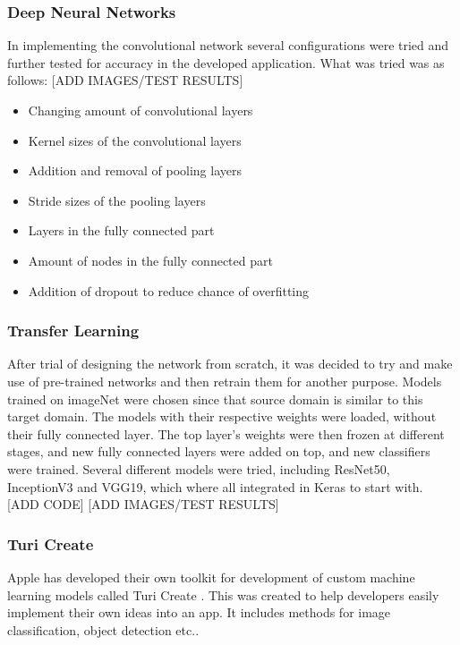 \subsubsection{Deep Neural Networks}
In implementing the convolutional network several configurations were tried and further tested for accuracy in the developed application. What was tried was as follows:
[ADD IMAGES/TEST RESULTS]

\begin{itemize}
\item Changing amount of convolutional layers
\item Kernel sizes of the convolutional layers
\item Addition and removal of pooling layers
\item Stride sizes of the pooling layers
\item Layers in the fully connected part
\item Amount of nodes in the fully connected part
\item Addition of dropout to reduce chance of overfitting 
\end{itemize}

\subsubsection{Transfer Learning}
After trial of designing the network from scratch, it was decided to try and make use of pre-trained networks and then retrain them for another purpose. Models trained on imageNet \cite{imageNet} were chosen since that source domain is similar to this target domain. The models with their respective weights were loaded, without their fully connected layer. The top layer's weights were then frozen at different stages, and new fully connected layers were added on top, and new classifiers were trained. 
Several different models were tried, including ResNet50, InceptionV3 and VGG19, which where all integrated in Keras to start with.
[ADD CODE]
[ADD IMAGES/TEST RESULTS]

\subsubsection{Turi Create}
Apple has developed their own toolkit for development of custom machine learning models called Turi Create \cite{turiCreate}. This was created to help developers easily implement their own ideas into an app. It includes methods for image classification, object detection etc.. 

